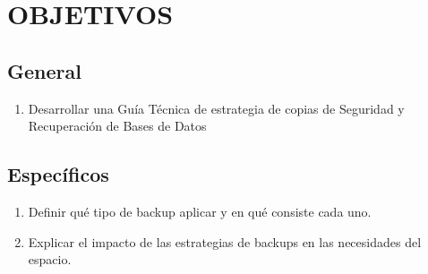 \chapter{OBJETIVOS}

\section{General}
\begin{enumerate}
\item Desarrollar una Guía Técnica de estrategia de copias de Seguridad y Recuperación de Bases de Datos
\end{enumerate}

\section{Espec\'ificos}
\begin{enumerate}
\item Definir qué tipo de backup aplicar y en qué consiste cada uno.
\item Explicar el impacto de las estrategias de backups en las necesidades del espacio.

\end{enumerate}